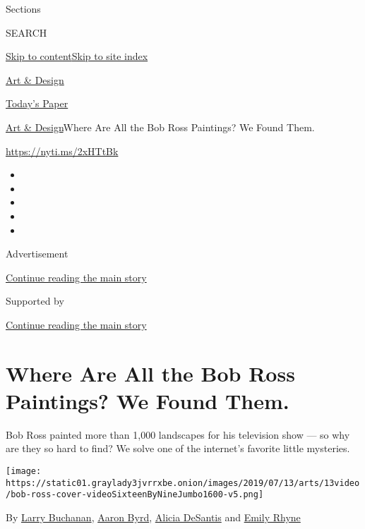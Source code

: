 Sections

SEARCH

\protect\hyperlink{site-content}{Skip to
content}\protect\hyperlink{site-index}{Skip to site index}

\href{https://www.nytimes3xbfgragh.onion/section/arts/design}{Art \&
Design}

\href{https://myaccount.nytimes3xbfgragh.onion/auth/login?response_type=cookie\&client_id=vi}{}

\href{https://www.nytimes3xbfgragh.onion/section/todayspaper}{Today's
Paper}

\href{/section/arts/design}{Art \& Design}\textbar{}Where Are All the
Bob Ross Paintings? We Found Them.

\url{https://nyti.ms/2xHTtBk}

\begin{itemize}
\item
\item
\item
\item
\item
\end{itemize}

Advertisement

\protect\hyperlink{after-top}{Continue reading the main story}

Supported by

\protect\hyperlink{after-sponsor}{Continue reading the main story}

\hypertarget{where-are-all-the-bob-ross-paintings-we-found-them}{%
\section{Where Are All the Bob Ross Paintings? We Found
Them.}\label{where-are-all-the-bob-ross-paintings-we-found-them}}

Bob Ross painted more than 1,000 landscapes for his television show ---
so why are they so hard to find? We solve one of the internet's favorite
little mysteries.

\texttt{[image: https://static01.graylady3jvrrxbe.onion/images/2019/07/13/arts/13video/bob-ross-cover-videoSixteenByNineJumbo1600-v5.png]}

By \href{https://www.nytimes3xbfgragh.onion/by/larry-buchanan}{Larry
Buchanan}, \href{https://www.nytimes3xbfgragh.onion/by/aaron-byrd}{Aaron
Byrd},
\href{https://www.nytimes3xbfgragh.onion/by/alicia-desantis}{Alicia
DeSantis} and
\href{https://www.nytimes3xbfgragh.onion/by/emily-rhyne}{Emily Rhyne}

